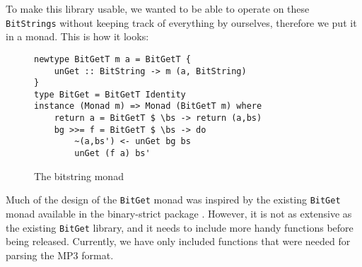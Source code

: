 \documentclass[a4paper,12pt]{article}
\begin{document}
        To make this library usable, we wanted to be able to operate on these
        \texttt{BitStrings} without keeping track of everything by ourselves,
        therefore we put it in a monad. This is how it looks:

\begin{figure}[H]
  \begin{center}
        \begin{lstlisting}
newtype BitGetT m a = BitGetT {
    unGet :: BitString -> m (a, BitString)
}
type BitGet = BitGetT Identity
instance (Monad m) => Monad (BitGetT m) where
    return a = BitGetT $ \bs -> return (a,bs)
    bg >>= f = BitGetT $ \bs -> do
        ~(a,bs') <- unGet bg bs
        unGet (f a) bs'
    \end{lstlisting}
    \caption{The bitstring monad}\label{fig:bitstringmonad}
  \end{center}
\end{figure}

    Much of the design of the \texttt{BitGet} monad was inspired by the existing
    \texttt{BitGet} monad available in the binary-strict package
    \cite{binarystrict}. However, it is not as extensive as the existing
    \texttt{BitGet} library, and it needs to include more handy functions before
    being released. Currently, we have only included functions that were needed
    for parsing the MP3 format.
\end{document}
